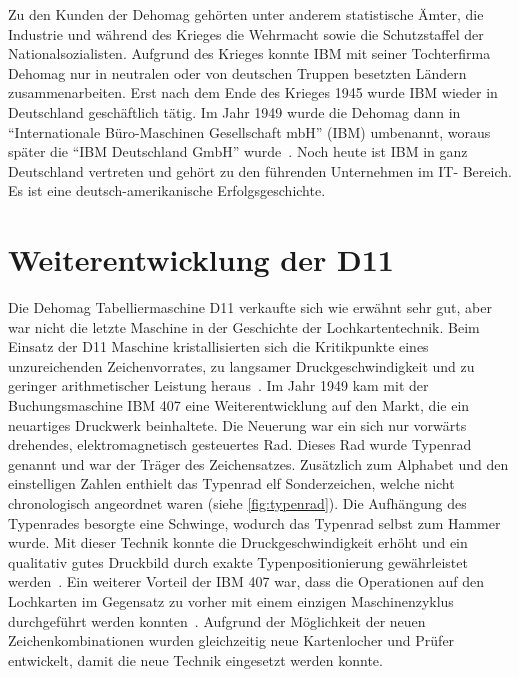 \documentclass[parskip=half]{scrartcl}
\begin{document}
Zu den Kunden der Dehomag gehörten unter anderem statistische Ämter, die
Industrie und während des Krieges die Wehrmacht sowie die Schutzstaffel der
Nationalsozialisten. Aufgrund des Krieges konnte IBM mit seiner Tochterfirma
Dehomag nur in neutralen oder von deutschen Truppen besetzten Ländern
zusammenarbeiten. Erst nach dem Ende des Krieges 1945 wurde IBM wieder in
Deutschland geschäftlich tätig. Im Jahr 1949 wurde die Dehomag dann in
\enquote{Internationale Büro-Maschinen Gesellschaft mbH} (IBM) umbenannt,
woraus später die \enquote{IBM Deutschland GmbH} wurde~\cite{sendler}.
Noch heute ist IBM in ganz Deutschland vertreten und gehört zu den führenden
Unternehmen im IT- Bereich. Es ist eine deutsch-amerikanische
Erfolgsgeschichte.

\section{Weiterentwicklung der D11}

Die Dehomag Tabelliermaschine D11 verkaufte sich wie erwähnt sehr gut, aber war
nicht die letzte Maschine in der Geschichte der Lochkartentechnik. Beim Einsatz
der D11 Maschine kristallisierten sich die Kritikpunkte eines unzureichenden
Zeichenvorrates, zu langsamer Druckgeschwindigkeit und zu geringer
arithmetischer Leistung heraus~\cite{sandner}. Im Jahr 1949 kam mit der
Buchungsmaschine IBM 407 eine Weiterentwicklung auf den Markt, die ein
neuartiges Druckwerk beinhaltete. Die Neuerung war ein sich nur vorwärts
drehendes, elektromagnetisch gesteuertes Rad. Dieses Rad wurde Typenrad genannt
und war der Träger des Zeichensatzes. Zusätzlich zum Alphabet und den
einstelligen Zahlen enthielt das Typenrad elf Sonderzeichen, welche nicht
chronologisch angeordnet waren (siehe \autoref{fig:typenrad}). Die Aufhängung
des Typenrades besorgte eine Schwinge, wodurch das Typenrad selbst zum Hammer
wurde. Mit dieser Technik konnte die Druckgeschwindigkeit erhöht und ein
qualitativ gutes Druckbild durch exakte Typenpositionierung gewährleistet
werden~\cite{sandner}. Ein weiterer Vorteil der IBM 407 war, dass die
Operationen auf den Lochkarten im Gegensatz zu vorher mit einem einzigen
Maschinenzyklus durchgeführt werden konnten~\cite{Boyell}. Aufgrund der
Möglichkeit der neuen Zeichenkombinationen wurden gleichzeitig neue
Kartenlocher und Prüfer entwickelt, damit die neue Technik eingesetzt werden
konnte.
\end{document}
